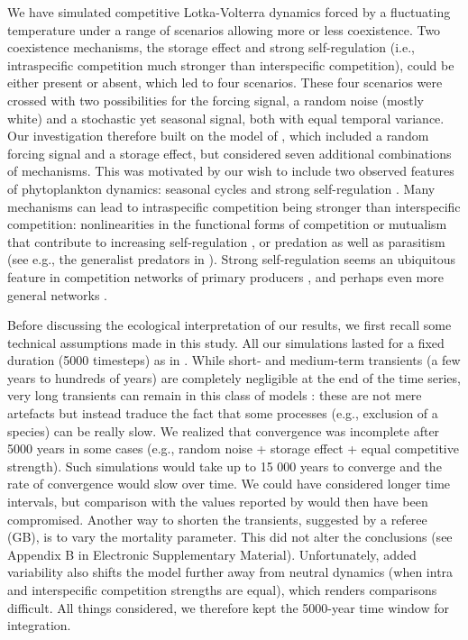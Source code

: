 \documentclass[a4paper,12pt]{article}
\begin{document}
We have simulated competitive Lotka-Volterra dynamics forced by a
fluctuating temperature under a range of scenarios allowing more or
less coexistence. Two coexistence mechanisms, the storage effect and
strong self-regulation (i.e., intraspecific competition much stronger
than interspecific competition), could be either present or absent,
which led to four scenarios. These four scenarios were crossed with
two possibilities for the forcing signal, a random noise (mostly white)
and a stochastic yet seasonal signal, both with equal temporal variance.
Our investigation therefore built on the model of \citet{scranton_coexistence_2016},
which included a random forcing signal and a storage effect, but considered
seven additional combinations of mechanisms. This was motivated by
our wish to include two observed features of phytoplankton dynamics:
seasonal cycles \citep{winder_annual_2010,boyce_environmental_2017}
and strong self-regulation \citep{chesson_mechanisms_2000,adler_coexistence_2010,barraquand2018coastal}.
Many mechanisms can lead to intraspecific competition being stronger
than interspecific competition: nonlinearities in the functional forms
of competition or mutualism that contribute to increasing self-regulation
\citep{kawatsu2018density}, or predation as well as parasitism (see
e.g., the generalist predators in \citealp{haydon1994pivotal}). Strong
self-regulation seems an ubiquitous feature in competition networks
of primary producers \citep{adler_competition_2018}, and perhaps
even more general networks \citep{barabas_self-regulation_2017}.

Before discussing the ecological interpretation of our results, we
first recall some technical assumptions made in this study. All our
simulations lasted for a fixed duration (5000 timesteps) as in \citet{scranton_coexistence_2016}.
While short- and medium-term transients (a few years to hundreds of
years) are completely negligible at the end of the time series, very
long transients can remain in this class of models \citep{scheffer_self-organized_2006,hastings_transient_2018}:
these are not mere artefacts but instead traduce the fact that some
processes (e.g., exclusion of a species) can be really slow. We realized
that convergence was incomplete after 5000 years in some cases (e.g.,
random noise + storage effect + equal competitive strength). Such
simulations would take up to 15 000 years to converge and the rate
of convergence would slow over time. We could have considered longer
time intervals, but comparison with the values reported by \citet{scranton_coexistence_2016}
would then have been compromised. Another way to shorten the transients,
suggested by a referee (GB), is to vary the mortality parameter. This
did not alter the conclusions (see Appendix B in Electronic Supplementary
Material). Unfortunately, added variability also shifts the model
further away from neutral dynamics (when intra and interspecific competition
strengths are equal), which renders comparisons difficult. All things
considered, we therefore kept the 5000-year time window for integration.
\end{document}
